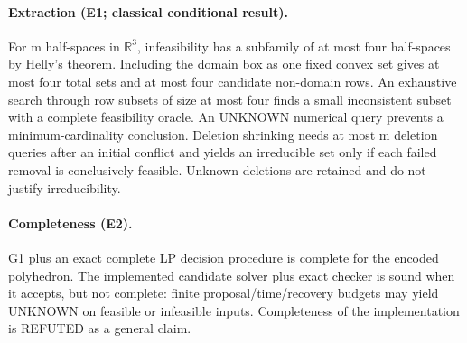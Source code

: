 \documentclass[11pt]{article}
\begin{document}
\paragraph{Extraction (E1; classical conditional result).}
For m half-spaces in $\mathbb R^3$, infeasibility has a subfamily of at most four half-spaces by Helly's theorem. Including the domain box as one fixed convex set gives at most four total sets and at most four candidate non-domain rows. An exhaustive search through row subsets of size at most four finds a small inconsistent subset with a complete feasibility oracle. An UNKNOWN numerical query prevents a minimum-cardinality conclusion. Deletion shrinking needs at most m deletion queries after an initial conflict and yields an irreducible set only if each failed removal is conclusively feasible. Unknown deletions are retained and do not justify irreducibility.

\paragraph{Completeness (E2).}
G1 plus an exact complete LP decision procedure is complete for the encoded polyhedron. The implemented candidate solver plus exact checker is sound when it accepts, but not complete: finite proposal/time/recovery budgets may yield UNKNOWN on feasible or infeasible inputs. Completeness of the implementation is REFUTED as a general claim.
\end{document}
